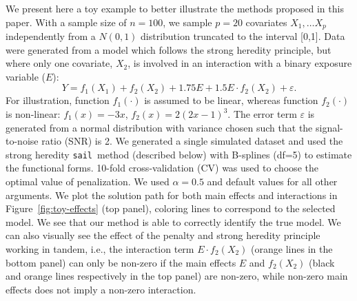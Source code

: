 \documentclass[a4paper,fleqn]{cas-sc}
\newcommand{\sail}{\texttt{sail}}
\begin{document}
We present here a toy example to better illustrate the methods proposed in this paper. 
With a sample size of $n=100$, we sample $p=20$ covariates $X_1, \ldots X_p$ independently from a $N(0,1)$ distribution truncated to the interval [0,1]. 
Data were generated from a model which follows the strong heredity principle, but where only one covariate, $X_2$, is involved in an interaction with a binary exposure variable ($E$): 
\[Y = f_1(X_1) + f_2(X_2) + 1.75 E + 1.5 E \cdot f_2(X_2) + \varepsilon.\]
For illustration, function $f_1(\cdot)$ is assumed to be linear, whereas function $f_2(\cdot)$ is non-linear: $f_1(x) = -3x$, $f_2(x) = 2(2x-1)^3$. 
The error term $\varepsilon$ is generated from a normal distribution with variance chosen such that the signal-to-noise ratio (SNR) is 2. 
We generated a single simulated dataset and used the strong heredity \sail ~method (described below) with B-splines (df=5) to estimate the functional forms. 
10-fold cross-validation (CV) was used to choose the optimal value of penalization. We used $\alpha=0.5$ and default values for all other arguments. 
We plot the solution path for both main effects and interactions in Figure~\ref{fig:toy-effects} (top panel), coloring lines to correspond to the selected model. We see that our method is able to correctly identify the true model. 
We can also visually see the effect of the penalty and strong heredity principle working in tandem, i.e., the interaction term $E \cdot f_2(X_2)$ (orange lines in the bottom panel) can only be non-zero if the main effects $E$ and $f_2(X_2)$ (black and orange lines respectively in the top panel) are non-zero, while non-zero main effects does not imply a non-zero interaction.



%
%
%
\end{document}
